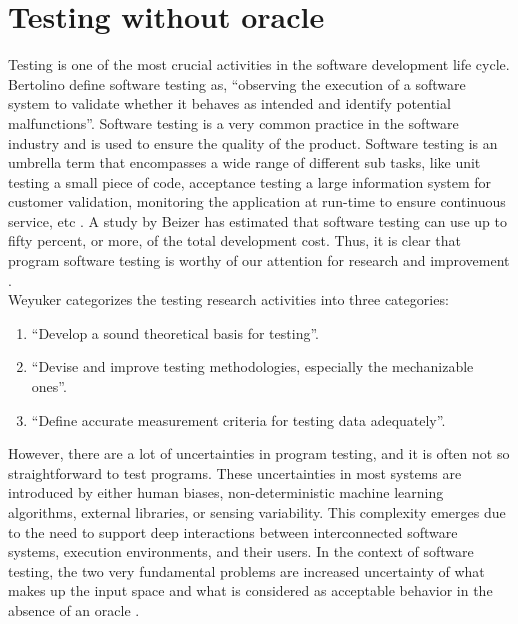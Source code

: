 




\section{Testing without oracle}
Testing is one of the most crucial activities in the software development life cycle. Bertolino \cite{Bertolino2007} define software testing as, \enquote{observing the execution of a software system to validate whether it behaves as intended and identify potential malfunctions}. Software testing is a very common practice in the software industry and is used to ensure the quality of the product. Software testing is an umbrella term that encompasses a wide range of different sub tasks, like unit testing a small piece of code, acceptance testing a large information system for customer validation, monitoring the application at run-time to ensure continuous service, etc \cite{Bertolino2007}. A study by Beizer \cite{Beizer1990} has estimated that software testing can use up to fifty percent, or more, of the total development cost. Thus, it is clear that program software testing is worthy of our attention for research and improvement \cite{Beizer1990}.\\
Weyuker \cite{Weyuker} categorizes the testing research activities into three categories:
\begin{enumerate}
  \item \enquote{Develop a sound theoretical basis for testing}.
  \item \enquote{Devise and improve testing methodologies, especially the mechanizable ones}.
  \item \enquote{Define accurate measurement criteria for testing data adequately}.
\end{enumerate}

However,  there are a lot of uncertainties in program testing, and it is often not so straightforward to test programs. These uncertainties in most systems are introduced by either human biases, non-deterministic machine learning algorithms, external libraries, or sensing variability. This complexity emerges due to the need to support deep interactions between interconnected software systems, execution environments, and their users. In the context of software testing, the two very fundamental problems are increased uncertainty of what makes up the input space and what is considered as acceptable behavior in the absence of an oracle \cite{Chen2002,Elbaum2014}.

